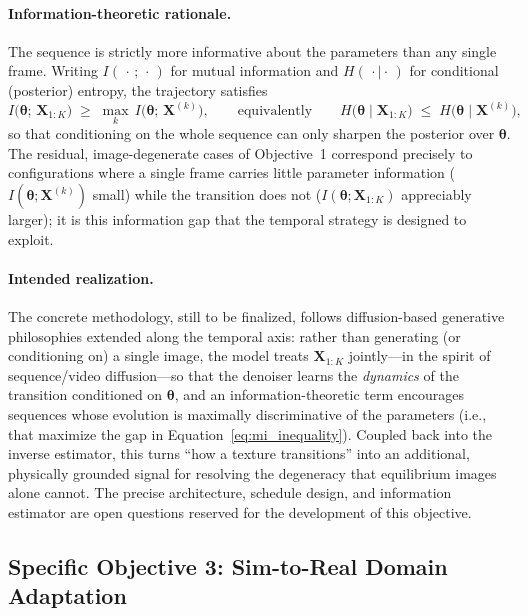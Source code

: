 \documentclass[letterpaper, 12, one column]{article}
\begin{document}
\paragraph{Information-theoretic rationale.}
The sequence is strictly more informative about the parameters than any single frame. Writing $I(\,\cdot\,;\,\cdot\,)$ for mutual information and $H(\,\cdot\mid\cdot\,)$ for conditional (posterior) entropy, the trajectory satisfies
\begin{equation}\label{eq:mi_inequality}
I\big(\boldsymbol{\theta};\,\mathbf{X}_{1:K}\big) \;\ge\; \max_{k}\, I\big(\boldsymbol{\theta};\,\mathbf{X}^{(k)}\big),
\qquad\text{equivalently}\qquad
H\big(\boldsymbol{\theta}\mid \mathbf{X}_{1:K}\big) \;\le\; H\big(\boldsymbol{\theta}\mid \mathbf{X}^{(k)}\big),
\end{equation}
so that conditioning on the whole sequence can only sharpen the posterior over $\boldsymbol{\theta}$. The residual, image-degenerate cases of Objective~1 correspond precisely to configurations where a single frame carries little parameter information ($I(\boldsymbol{\theta};\mathbf{X}^{(k)})$ small) while the transition does not ($I(\boldsymbol{\theta};\mathbf{X}_{1:K})$ appreciably larger); it is this information gap that the temporal strategy is designed to exploit.

\paragraph{Intended realization.}
The concrete methodology, still to be finalized, follows diffusion-based generative philosophies extended along the temporal axis: rather than generating (or conditioning on) a single image, the model treats $\mathbf{X}_{1:K}$ jointly---in the spirit of sequence/video diffusion---so that the denoiser learns the \emph{dynamics} of the transition conditioned on $\boldsymbol{\theta}$, and an information-theoretic term encourages sequences whose evolution is maximally discriminative of the parameters (i.e., that maximize the gap in Equation~\ref{eq:mi_inequality}). Coupled back into the inverse estimator, this turns ``how a texture transitions'' into an additional, physically grounded signal for resolving the degeneracy that equilibrium images alone cannot. The precise architecture, schedule design, and information estimator are open questions reserved for the development of this objective.

\subsection{Specific Objective 3: Sim-to-Real Domain Adaptation}
\end{document}
